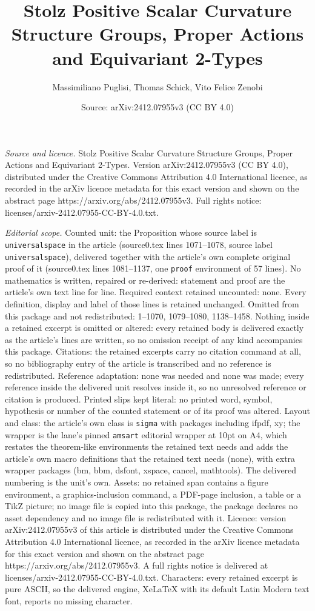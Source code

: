 \documentclass[10pt,a4paper]{amsart}
\title[Stolz Positive Scalar Curvature Structure Groups, Proper Act]{Stolz Positive Scalar Curvature Structure Groups, Proper Actions and Equivariant 2-Types}
\author{Massimiliano Puglisi, Thomas Schick, Vito Felice Zenobi}
\date{Source: arXiv:2412.07955v3 (CC BY 4.0)}
\begin{document}
\maketitle

\noindent\emph{Source and licence.} Stolz Positive Scalar Curvature Structure Groups, Proper Actions and Equivariant 2-Types. Version arXiv:2412.07955v3 (CC BY 4.0), distributed under the Creative Commons Attribution 4.0 International licence, as recorded in the arXiv licence metadata for this exact version and shown on the abstract page https://arxiv.org/abs/2412.07955v3. Full rights notice: licenses/arxiv-2412.07955-CC-BY-4.0.txt.\par\smallskip

\noindent\textit{Editorial scope.} Counted unit: the Proposition whose source label is \texttt{universalspace} in the article (source0.tex lines 1071--1078, source label \texttt{universalspace}), delivered together with the article's own complete original proof of it (source0.tex lines 1081--1137, one \texttt{proof} environment of 57 lines). No mathematics is written, repaired or re-derived: statement and proof are the article's own text line for line. Required context retained uncounted: none. Every definition, display and label of those lines is retained unchanged. Omitted from this package and not redistributed: 1--1070, 1079--1080, 1138--1458. Nothing inside a retained excerpt is omitted or altered: every retained body is delivered exactly as the article's lines are written, so no omission receipt of any kind accompanies this package. Citations: the retained excerpts carry no citation command at all, so no bibliography entry of the article is transcribed and no reference is redistributed. Reference adaptation: none was needed and none was made; every reference inside the delivered unit resolves inside it, so no unresolved reference or citation is produced. Printed slips kept literal: no printed word, symbol, hypothesis or number of the counted statement or of its proof was altered. Layout and class: the article's own class is \texttt{sigma} with packages including ifpdf, xy; the wrapper is the lane's pinned \texttt{amsart} editorial wrapper at 10pt on A4, which restates the theorem-like environments the retained text needs and adds the article's own macro definitions that the retained text needs (none), with extra wrapper packages (bm, bbm, dsfont, xspace, cancel, mathtools). The delivered numbering is the unit's own. Assets: no retained span contains a figure environment, a graphics-inclusion command, a PDF-page inclusion, a table or a TikZ picture; no image file is copied into this package, the package declares no asset dependency and no image file is redistributed with it. Licence: version arXiv:2412.07955v3 of this article is distributed under the Creative Commons Attribution 4.0 International licence, as recorded in the arXiv licence metadata for this exact version and shown on the abstract page https://arxiv.org/abs/2412.07955v3. A full rights notice is delivered at licenses/arxiv-2412.07955-CC-BY-4.0.txt. Characters: every retained excerpt is pure ASCII, so the delivered engine, XeLaTeX with its default Latin Modern text font, reports no missing character.
\end{document}
